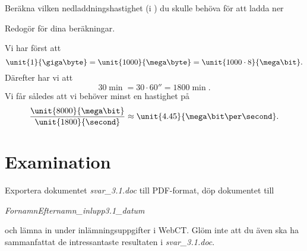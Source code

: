 \documentclass[11pt,a4paper]{miunasgn}
\newcommand{\Mbps}{\mega\bit\per\second}
\begin{document}
\begin{questions}
\question
Beräkna vilken nedladdningshastighet (i \Mbps) du skulle behöva för att ladda
ner

Redogör för dina beräkningar.
\begin{solution}
	Vi har först att \[
		\unit{1}{\giga\byte} = \unit{1000}{\mega\byte} =
		\unit{1000\cdot 8}{\mega\bit}.
	\]
	Därefter har vi att \[
		\unit{30}{\min} = \unit{30\cdot 60}{\second} =
		\unit{1800}{\min}.
	\]
	Vi får således att vi behöver minst en hastighet på \[
		\frac{\unit{8000}{\mega\bit}}{\unit{1800}{\second}} \approx
		\unit{4.45}{\mega\bit\per\second}.
	\]
\end{solution}

\end{questions}


\section{Examination}
\label{sec:Examination}
\noindent
Exportera dokumentet \emph{svar\_3.1.doc} till PDF-format, döp dokumentet till
\begin{center}
\emph{FornamnEfternamn\_inlupp3.1\_datum}
\end{center}
och lämna in under inlämningsuppgifter i WebCT.
Glöm inte att du även ska ha sammanfattat de intressantaste resultaten i
\emph{svar\_3.1.doc}.



\end{document}
